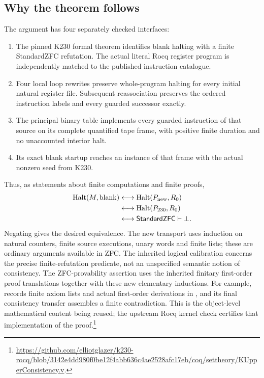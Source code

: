 \documentclass[11pt,a4paper]{article}
\newcommand{\Halt}{\operatorname{Halt}}
\newcommand{\code}[1]{\texttt{\detokenize{#1}}}
\begin{document}
\subsection{Why the theorem follows}

The argument has four separately checked interfaces:
\begin{enumerate}[leftmargin=*,itemsep=2pt]
\item The pinned K230 formal theorem identifies blank halting with a
finite StandardZFC refutation. The actual literal Rocq register program
is independently matched to the published instruction catalogue.
\item Four local loop rewrites preserve whole-program halting for
every initial natural register file. Subsequent reassociation preserves
the ordered instruction labels and every guarded successor exactly.
\item The principal binary table implements every guarded instruction
of that source on its complete quantified tape frame, with positive
finite duration and no unaccounted interior halt.
\item Its exact blank startup reaches an instance of that frame with
the actual nonzero seed from K230.
\end{enumerate}

Thus, as statements about finite computations and finite proofs,
\[
\begin{aligned}
 \Halt(M,\mathrm{blank})
 &\longleftrightarrow \Halt(P_{\rm new},R_0)\\
 &\longleftrightarrow \Halt(P_{230},R_0)\\
 &\longleftrightarrow \mathsf{StandardZFC}\vdash\bot.
\end{aligned}
\]
Negating gives the desired equivalence. The new transport uses induction
on natural counters, finite source executions, unary words and finite
lists; these are ordinary arguments available in ZFC. The inherited
logical calibration concerns the precise finite-refutation predicate,
not an unspecified semantic notion of consistency.
The ZFC-provability assertion uses the inherited finitary first-order
proof translations together with these new elementary inductions.
For example, \code{KUpperConsistency.v} records finite axiom lists and
actual first-order derivations in \code{core_holdsL}, and its final
consistency transfer assembles a finite contradiction. This is the
object-level mathematical content being reused; the upstream Rocq
kernel check certifies that implementation of the proof.\footnote{
\url{https://github.com/elliotglazer/k230-rocq/blob/3142e4dd980f0be12f4abb636c4ae2528afc17eb/coq/settheory/KUpperConsistency.v}.}
\end{document}
